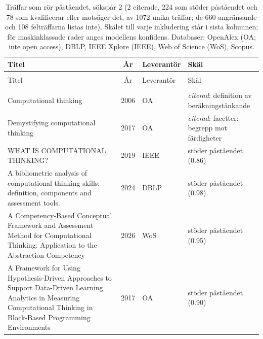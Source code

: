 
\begingroup\footnotesize
\begin{longtable}{@{}%
  >{\raggedright\arraybackslash}p{}c%
  >{\raggedright\arraybackslash}p{}%
  >{\raggedright\arraybackslash}p{}@{}}
\caption{Träffar som rör påståendet, sökspår 2 (2 citerade, 224 som stöder påståendet och 78 som kvalificerar eller motsäger det, av 1072 unika träffar; de 660 angränsande och 108 felträffarna listas inte). Skälet till varje inkludering står i sista kolumnen; för maskinklassade rader anges modellens konfidens. Databaser: OpenAlex (OA; inte open access), DBLP, IEEE Xplore (IEEE), Web of Science (WoS), Scopus.}\label{tab:sok-B2}\\
\toprule
Titel & År & Leverantör & Skäl \\
\midrule
\endfirsthead
\multicolumn{4}{@{}l}{\emph{\tablename~\thetable{} (forts.)}}\\
\toprule
Titel & År & Leverantör & Skäl \\
\midrule
\endhead
\midrule \multicolumn{4}{r@{}}{\emph{forts.\ på nästa sida}}\\
\endfoot
\bottomrule
\endlastfoot
Computational thinking & 2006 & OA & \emph{citerad}: definition av beräkningstänkande \\
Demystifying computational thinking & 2017 & OA & \emph{citerad}: facetter: begrepp mot färdigheter \\
1 WHAT IS COMPUTATIONAL THINKING? & 2019 & IEEE & stöder påståendet (0.86) \\
A bibliometric analysis of computational thinking skills: definition, components and assessment tools. & 2024 & DBLP & stöder påståendet (0.98) \\
A Competency-Based Conceptual Framework and Assessment Method for Computational Thinking: Application to the Abstraction Competency & 2026 & WoS & stöder påståendet (0.95) \\
A Framework for Using Hypothesis-Driven Approaches to Support Data-Driven Learning Analytics in Measuring Computational Thinking in Block-Based Programming Environments & 2017 & OA & stöder påståendet (0.90) \\

\end{longtable}
